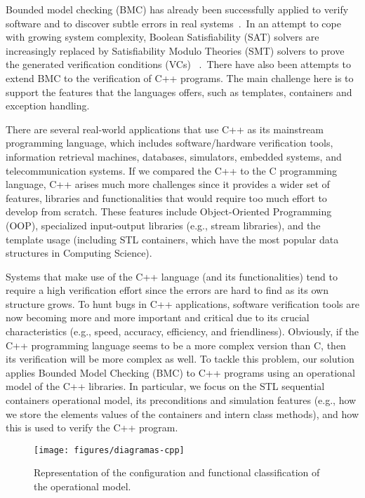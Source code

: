 \documentclass[a4paper]{llncs}
\begin{document}
Bounded model checking (BMC) has already been successfully applied to
verify software and to discover subtle errors in real
systems~\cite{handbook09}.\ In an attempt to cope with growing 
system complexity, Boolean Satisfiability (SAT) solvers are increasingly 
replaced by Satisfiability Modulo Theories (SMT) solvers to prove the generated 
verification conditions (VCs) ~\cite{Armando09,Ganai06,Cordeiro12}.\
There have also been attempts to extend BMC to the verification of C++ programs.
The main challenge here is to support the features that the languages offers, 
such as templates, containers and exception handling.

There are several real-world applications that use C++ as its mainstream programming 
language, which includes software/hardware verification tools, information retrieval 
machines, databases, simulators, embedded systems, and telecommunication systems. 
If we compared the C++ to the C programming language, C++ arises much more challenges 
since it provides a wider set of features, libraries and functionalities that would require 
too much effort to develop from scratch. These features include Object-Oriented Programming (OOP), 
specialized input-output libraries (e.g., stream libraries), and the template usage 
(including STL containers, which have the most popular data structures in Computing Science).

Systems that make use of the C++ language (and its functionalities) tend to require a high 
verification effort since the errors are hard to find as its own structure grows. 
To hunt bugs in C++ applications, software verification tools are now becoming more and more important 
and critical due to its crucial characteristics (e.g., speed, accuracy, efficiency, and friendliness). 
Obviously, if the C++ programming language seems to be a more complex version than C, then its verification 
will be more complex as well. To tackle this problem, our solution applies Bounded Model Checking (BMC) 
to C++ programs using an operational model of the C++ libraries. In particular, we focus on the STL 
sequential containers operational model, its preconditions and simulation features 
(e.g., how we store the elements values of the containers and intern class methods), 
and how this is used to verify the C++ program.

\begin{figure*}[ht]
\centering
\texttt{[image: figures/diagramas-cpp]}
\caption{Representation of the configuration and functional classification of the operational model.}
\label{figure:cpp-diagram}
\end{figure*}
\end{document}
